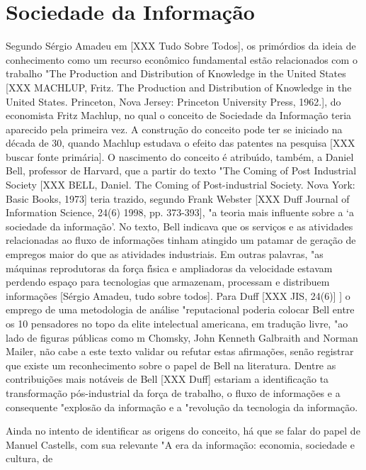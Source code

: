 \documentclass[
12pt,		%
openright,	%
twoside,  %
a4paper,			%
chapter=TITLE,		%
english,			%
french,				%
spanish,			%
brazil				%
]{USPSC-classe/USPSC}
\begin{document}
\section[Sociedade da Informa\c{c}\~ao]{Sociedade da Informa\c{c}\~ao}\label{Sociedade da Informa\c{c}\~ao}
Segundo S\'ergio Amadeu em [XXX Tudo Sobre Todos], os prim\'ordios da ideia de conhecimento como um recurso econ\^omico fundamental est\~ao relacionados com o trabalho "The Production and Distribution of Knowledge in the United States [XXX MACHLUP, Fritz. The Production and Distribution of Knowledge in the United States. Princeton, Nova Jersey: Princeton University Press, 1962.], do economista Fritz Machlup, no qual o conceito de Sociedade da Informa\c{c}\~ao teria aparecido pela primeira vez. A constru\c{c}\~ao do conceito pode ter se iniciado na d\'ecada de 30, quando Machlup estudava o efeito das patentes na pesquisa [XXX buscar fonte prim\'aria]. O nascimento do conceito \'e atribu\'{\i}do, tamb\'em, a Daniel Bell, professor de Harvard, que a partir do texto "The Coming of Post Industrial Society [XXX BELL, Daniel. The Coming of Post-industrial Society. Nova York: Basic Books, 1973] teria trazido, segundo Frank Webster [XXX Duff Journal of Information Science, 24(6) 1998, pp. 373-393], "a teoria mais influente sobre a ‘a sociedade da informa\c{c}\~ao’. No texto, Bell indicava que os servi\c{c}os e as atividades relacionadas ao fluxo de informa\c{c}\~oes tinham atingido um patamar de gera\c{c}\~ao de empregos maior do que as atividades industriais. Em outras palavras, "as m\'aquinas reprodutoras da for\c{c}a f\'{\i}sica e ampliadoras da velocidade estavam perdendo espa\c{c}o para tecnologias que armazenam, processam e distribuem informa\c{c}\~oes [S\'ergio Amadeu, tudo sobre todos]. Para Duff [XXX JIS, 24(6)] ] o emprego de uma metodologia de an\'alise "reputacional poderia colocar Bell entre os 10 pensadores no topo da elite intelectual americana, em tradu\c{c}\~ao livre, "ao lado de figuras p\'ublicas como m Chomsky, John Kenneth Galbraith and Norman Mailer, n\~ao cabe a este texto validar ou refutar estas afirma\c{c}\~oes, sen\~ao registrar que existe um reconhecimento sobre o papel de Bell na literatura. Dentre as contribui\c{c}\~oes mais not\'aveis de Bell [XXX Duff] estariam a identifica\c{c}\~ao ta transforma\c{c}\~ao p\'os-industrial da for\c{c}a de trabalho, o fluxo de informa\c{c}\~oes e a consequente "explos\~ao da informa\c{c}\~ao e a "revolu\c{c}\~ao da tecnologia da informa\c{c}\~ao. 




Ainda no intento de identificar as origens do conceito, h\'a que se falar do papel de Manuel Castells, com sua relevante "A era da informa\c{c}\~ao: economia, sociedade e cultura, de 
\end{document}

